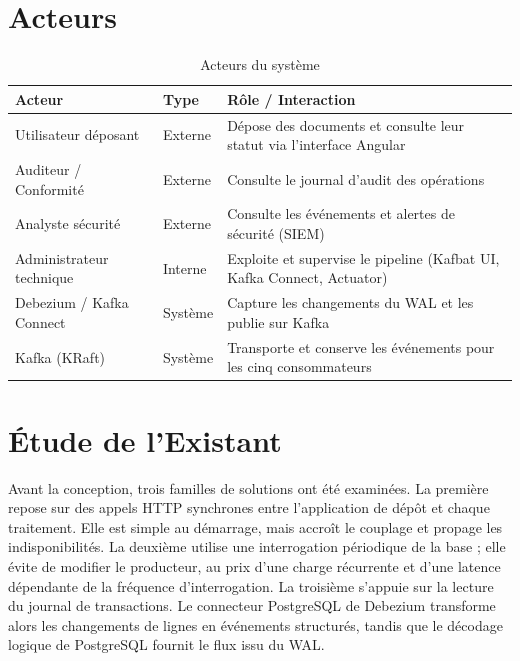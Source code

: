\documentclass[12pt,a4paper,openany]{report}
\begin{document}
    \section{Acteurs}

    \begin{table}[H]
    \centering
    \begin{tabularx}{\textwidth}{llX}
    \toprule
    \textbf{Acteur} & \textbf{Type} & \textbf{R\^ole / Interaction} \\
    \midrule
    Utilisateur d\'eposant   & Externe & D\'epose des documents et consulte leur statut via l'interface Angular \\
    Auditeur / Conformit\'e  & Externe & Consulte le journal d'audit des op\'erations \\
    Analyste s\'ecurit\'e    & Externe & Consulte les \'ev\'enements et alertes de s\'ecurit\'e (SIEM) \\
    Administrateur technique & Interne & Exploite et supervise le pipeline (Kafbat UI, Kafka Connect, Actuator) \\
    Debezium / Kafka Connect & Syst\`eme & Capture les changements du WAL et les publie sur Kafka \\
    Kafka (KRaft)            & Syst\`eme & Transporte et conserve les \'ev\'enements pour les cinq consommateurs \\
    \bottomrule
    \end{tabularx}
    \caption{Acteurs du syst\`eme}
    \end{table}

    \section{\'Etude de l'Existant}

    Avant la conception, trois familles de solutions ont \'et\'e examin\'ees. La premi\`ere repose sur des appels HTTP synchrones entre l'application de d\'ep\^ot et chaque traitement. Elle est simple au d\'emarrage, mais accro\^it le couplage et propage les indisponibilit\'es. La deuxi\`eme utilise une interrogation p\'eriodique de la base ; elle \'evite de modifier le producteur, au prix d'une charge r\'ecurrente et d'une latence d\'ependante de la fr\'equence d'interrogation. La troisi\`eme s'appuie sur la lecture du journal de transactions. Le connecteur PostgreSQL de Debezium transforme alors les changements de lignes en \'ev\'enements structur\'es\cite{debezium-postgresql}, tandis que le d\'ecodage logique de PostgreSQL fournit le flux issu du WAL\cite{postgres-logical-decoding}.
\end{document}

